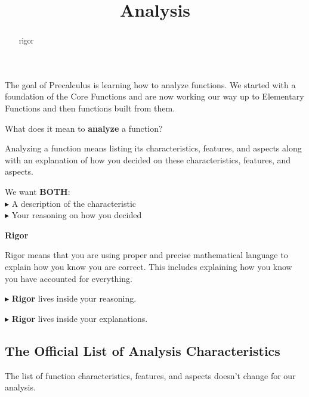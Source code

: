 \documentclass{ximera}
\title{Analysis}
\begin{document}
\begin{abstract}
rigor
\end{abstract}
\maketitle





The goal of Precalculus is learning how to analyze functions.  We started with a foundation of the Core Functions and are now working our way up to Elementary Functions and then functions built from them. 

What does it mean to \textbf{\textcolor{blue!55!black}{analyze}} a function? 



Analyzing a function means listing its characteristics, features, and aspects along with an explanation of how you decided on these characteristics, features, and aspects.


We want \textbf{BOTH}: \\
\textbf{\textcolor{red!70!darkgray}{$\blacktriangleright$}} A description of the characteristic \\
\textbf{\textcolor{red!70!darkgray}{$\blacktriangleright$}} Your reasoning on how you decided 



\begin{idea} \textbf{\textcolor{blue!55!black}{Rigor}} 

Rigor means that you are using proper and precise mathematical language to explain how you know you are correct. This includes explaining how you know you have accounted for everything.


\textbf{\textcolor{red!90!darkgray}{$\blacktriangleright$}} \textbf{\textcolor{purple!85!blue}{Rigor}} lives inside your reasoning. 

\textbf{\textcolor{red!90!darkgray}{$\blacktriangleright$}} \textbf{\textcolor{purple!85!blue}{Rigor}} lives inside your explanations. 



\end{idea}



\subsection*{The Official List of Analysis Characteristics}

The list of function characteristics, features, and aspects doesn't change for our analysis. 
\end{document}
